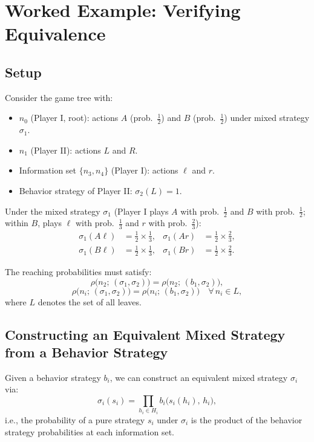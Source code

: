 \documentclass[12pt, a4paper]{article}
\begin{document}
\section{Worked Example: Verifying Equivalence}

\subsection{Setup}

Consider the game tree with:
\begin{itemize}
  \item $n_0$ (Player I, root): actions $A$ (prob.\ $\tfrac{1}{2}$) and $B$ (prob.\ $\tfrac{1}{2}$) under mixed strategy $\sigma_1$.
  \item $n_1$ (Player II): actions $L$ and $R$.
  \item Information set $\{n_3, n_4\}$ (Player I): actions $\ell$ and $r$.
  \item Behavior strategy of Player II: $\sigma_2(L) = 1$.
\end{itemize}

Under the mixed strategy $\sigma_1$ (Player I plays $A$ with prob.\ $\tfrac{1}{2}$ and $B$ with prob.\ $\tfrac{1}{2}$; within $B$, plays $\ell$ with prob.\ $\tfrac{1}{3}$ and $r$ with prob.\ $\tfrac{2}{3}$):
\begin{align*}
  \sigma_1(A\ell) &= \tfrac{1}{2} \times \tfrac{1}{3}, &
  \sigma_1(Ar)    &= \tfrac{1}{2} \times \tfrac{2}{3}, \\
  \sigma_1(B\ell) &= \tfrac{1}{2} \times \tfrac{1}{3}, &
  \sigma_1(Br)    &= \tfrac{1}{2} \times \tfrac{2}{3}.
\end{align*}

The reaching probabilities must satisfy:
\[
  \rho\bigl(n_2;\,(\sigma_1,\sigma_2)\bigr) = \rho\bigl(n_2;\,(b_1,\sigma_2)\bigr),
\]
\[
  \rho\bigl(n_i;\,(\sigma_1,\sigma_2)\bigr) = \rho\bigl(n_i;\,(b_1,\sigma_2)\bigr)
  \quad \forall\, n_i \in L,
\]
where $L$ denotes the set of all leaves.

\subsection{Constructing an Equivalent Mixed Strategy from a Behavior Strategy}

Given a behavior strategy $b_i$, we can construct an equivalent mixed strategy $\sigma_i$ via:
\[
  \sigma_i(s_i) = \prod_{h_i \in H_i} b_i\!\bigl(s_i(h_i),\, h_i\bigr),
\]
i.e., the probability of a pure strategy $s_i$ under $\sigma_i$ is the product of the behavior strategy probabilities at each information set.
\end{document}
